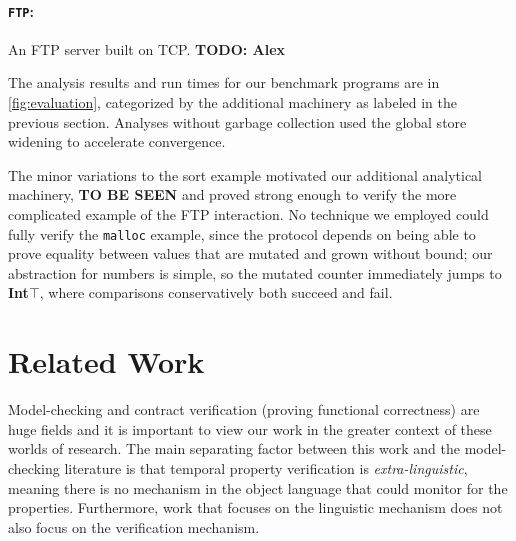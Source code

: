 \paragraph{{\tt FTP}:}{An FTP server built on TCP. \textbf{TODO: Alex}}

The analysis results and run times for our benchmark programs are in \autoref{fig:evaluation}, categorized by the additional machinery as labeled in the previous section.
%
Analyses without garbage collection used the global store widening to accelerate convergence.

The minor variations to the sort example motivated our additional analytical machinery, \textbf{TO BE SEEN} and proved strong enough to verify the more complicated example of the FTP interaction.
%
No technique we employed could fully verify the {\tt malloc} example, since the protocol depends on being able to prove equality between values that are mutated and grown without bound; our abstraction for numbers is simple, so the mutated counter immediately jumps to \textbf{Int}$\top$, where comparisons conservatively both succeed and fail.

\section{Related Work}

Model-checking and contract verification (proving functional correctness) are huge fields and it is important to view our work in the greater context of these worlds of research.
%
The main separating factor between this work and the model-checking literature is that temporal property verification is \emph{extra-linguistic}, meaning there is no mechanism in the object language that could monitor for the properties.
%
Furthermore, work that focuses on the linguistic mechanism does not also focus on the verification mechanism.

